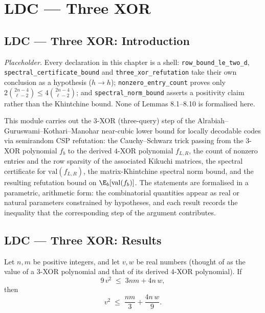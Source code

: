 \section{LDC --- Three XOR}
\subsection*{LDC --- Three XOR: Introduction}

\emph{Placeholder.}  Every declaration in this chapter is a shell: \texttt{row\_bound\_le\_two\_d}, \texttt{spectral\_certificate\_bound} and \texttt{three\_xor\_refutation} take their own conclusion as a hypothesis ($h \to h$); \texttt{nonzero\_entry\_count} proves only $2\binom{2n-4}{\ell-2} \le 4\binom{2n-4}{\ell-2}$; and \texttt{spectral\_norm\_bound} asserts a positivity claim rather than the Khintchine bound.  None of Lemmas 8.1--8.10 is formalised here.

This module carries out the $3$-XOR (three-query) step of the
Alrabiah--Guruswami--Kothari--Manohar near-cubic lower bound for locally decodable
codes via semirandom CSP refutation: the Cauchy--Schwarz trick passing from the
$3$-XOR polynomial $f_b$ to the derived $4$-XOR polynomial $f_{L,R}$, the count of
nonzero entries and the row sparsity of the associated Kikuchi matrices, the spectral
certificate for $\mathrm{val}(f_{L,R})$, the matrix-Khintchine spectral norm bound, and
the resulting refutation bound on $\E_b[\mathrm{val}(f_b)]$.
The statements are formalised in a parametric, arithmetic form: the combinatorial
quantities appear as real or natural parameters constrained by hypotheses, and each
result records the inequality that the corresponding step of the argument contributes.

\subsection*{LDC --- Three XOR: Results}

\begin{theorem}
\label{cauchy_schwarz_trick}
\leanok
{}
Let $n, m$ be positive integers, and let $v, w$ be real numbers (thought of as the value
of a $3$-XOR polynomial and that of its derived $4$-XOR polynomial). If
\[
  9\,v^{2} \;\le\; 3nm + 4n\,w,
\]
then
\[
  v^{2} \;\le\; \frac{nm}{3} + \frac{4n\,w}{9}.
\]
\end{theorem}

